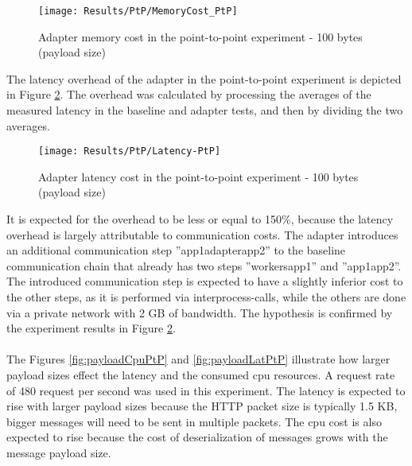 \begin{figure}[htbp]
    \centering
    \centerline{\texttt{[image: Results/PtP/MemoryCost\_PtP]}}
    \caption{Adapter memory cost in the point-to-point experiment - 100 bytes (payload size)}
    \label{fig:memCostPtp}
\end{figure}

\newpage

The latency overhead of the adapter in the point-to-point experiment is depicted in Figure \ref{fig:latPtP}.
The overhead was calculated by processing the averages of the measured latency in the baseline and adapter tests, and then by dividing the two averages.

\begin{figure}[htbp]
    \centering
    \centerline{\texttt{[image: Results/PtP/Latency-PtP]}}
    \caption{Adapter latency cost in the point-to-point experiment - 100 bytes (payload size)}
    \label{fig:latPtP}
\end{figure}

It is expected for the overhead to be less or equal to 150\%, because the latency overhead is largely attributable to communication costs.
The adapter introduces an additional communication step ''app1\textrightarrow adapter\textrightarrow app2'' to the baseline communication chain that already has two steps ''workers\textrightarrow app1'' and ''app1\textrightarrow app2''.
The introduced communication step is expected to have a slightly inferior cost to the other steps, as it is performed via interprocess-calls, while the others are done via a private network with 2 GB of bandwidth.
The hypothesis is confirmed by the experiment results in Figure \ref{fig:latPtP}.

\paragraph{}

The Figures  \ref{fig:payloadCpuPtP} and \ref{fig:payloadLatPtP} illustrate how larger payload sizes effect the latency and the consumed cpu resources.
A request rate of 480 request per second was used in this experiment.
The latency is expected to rise with larger payload sizes because the HTTP packet size is typically 1.5 KB, bigger messages will need to be sent in multiple packets.
The cpu cost is also expected to rise because the cost of deserialization of messages grows with the message payload size.

\paragraph{}

